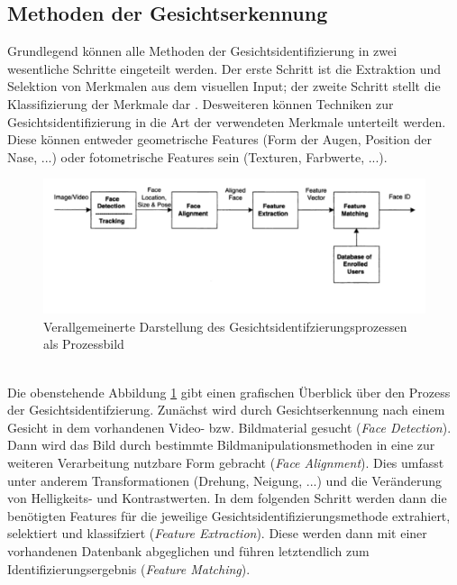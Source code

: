 \documentclass[doktyp=semarbeit, sprache=german]{TUBAFarbeiten}
\begin{document}
\subsection{Methoden der Gesichtserkennung}
Grundlegend können alle Methoden der Gesichtsidentifizierung in zwei wesentliche Schritte eingeteilt werden. Der erste Schritt ist die Extraktion und Selektion von Merkmalen aus dem visuellen Input; der zweite Schritt stellt die Klassifizierung der Merkmale dar \cite{FRS}. Desweiteren können Techniken zur Gesichtsidentifizierung in die Art der verwendeten Merkmale unterteilt werden. Diese können entweder geometrische Features (Form der Augen, Position der Nase, ...) oder fotometrische Features sein (Texturen, Farbwerte, ...).
\begin{figure}
	\centering
	\includegraphics[width=1\textwidth]{images/process}
	\caption{Verallgemeinerte Darstellung des Gesichtsidentifzierungsprozessen als Prozessbild \cite{DeepLearning}}
	\label{img:process}
\end{figure}
\\Die obenstehende Abbildung \ref{img:process} gibt einen grafischen Überblick über den Prozess der Gesichtsidentifzierung. Zunächst wird durch Gesichtserkennung nach einem Gesicht in dem vorhandenen Video- bzw. Bildmaterial gesucht (\textit{Face Detection}). Dann wird das Bild durch bestimmte Bildmanipulationsmethoden in eine zur weiteren Verarbeitung nutzbare Form gebracht (\textit{Face Alignment}). Dies umfasst unter anderem Transformationen (Drehung, Neigung, ...) und die Veränderung von Helligkeits- und Kontrastwerten. In dem folgenden Schritt werden dann die benötigten Features für die jeweilige Gesichtsidentifizierungsmethode extrahiert, selektiert und klassifziert (\textit{Feature Extraction}). Diese werden dann mit einer vorhandenen Datenbank abgeglichen und führen letztendlich zum Identifizierungsergebnis (\textit{Feature Matching}).
\end{document}
